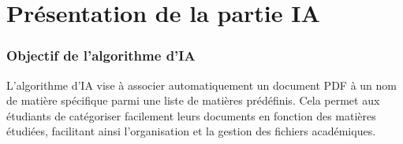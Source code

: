 \vspace{5mm}
\section{Présentation de la partie IA}
\vspace{5mm}
\subsubsection{Objectif de l'algorithme d'IA }
\vspace{5mm}
L'algorithme d'IA vise à associer automatiquement un document PDF à un nom de matière spécifique parmi une liste de matières prédéfinis. Cela permet aux étudiants de catégoriser facilement leurs documents en fonction des matières étudiées, facilitant ainsi l'organisation et la gestion des fichiers académiques.

\vspace{5mm}
